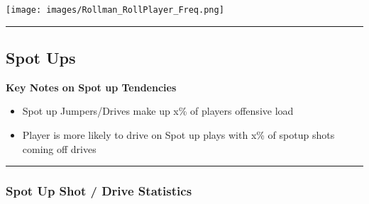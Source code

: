 \documentclass[a4paper,12pt]{article}
\begin{document}
\begin{table}[H]
{\begin{minipage}[t]{0.6\textwidth}
{\begin{tabular}
            \bottomrule
        \end{tabular}
        } %
    \end{minipage}
    } %
    \hfill %
    \begin{minipage}[c]{0.35\textwidth} %
        \flushright
        \texttt{[image: images/Rollman\_RollPlayer\_Freq.png]} %
    \end{minipage}
\end{table}

\vspace{-1em} %
\hrule height 1pt width 1\textwidth %
\vspace{1em} %

\clearpage

\subsection{Spot Ups}

\vspace{1.25em} %
\textbf{Key Notes on Spot up Tendencies}
\vspace{0.5em} %

\begin{itemize}
    \item Spot up Jumpers/Drives make up x\% of players offensive load
    \vspace{0.3em} %
    \item Player is more likely to drive on Spot up plays with x\% of spotup shots coming off drives
\end{itemize}

\vspace{1em} %
\hrule height 1pt width 1\textwidth %
\vspace{0em} %

\subsubsection{Spot Up Shot / Drive Statistics}
\end{document}
